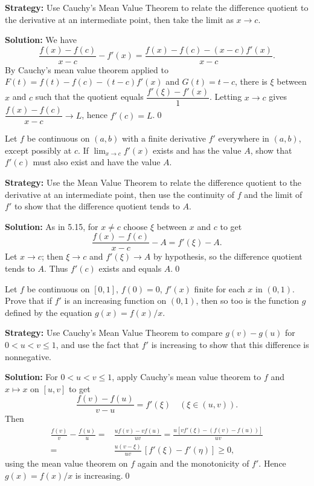 \noindent\textbf{Strategy:} Use Cauchy's Mean Value Theorem to relate the difference quotient to the derivative at an intermediate point, then take the limit as \( x \to c \).

\bigskip\noindent\textbf{Solution:}
We have
\[\frac{f(x)-f(c)}{x-c}-f'(x)=\frac{f(x)-f(c)-(x-c)f'(x)}{x-c}.\]
By Cauchy's mean value theorem applied to $F(t)=f(t)-f(c)-(t-c)f'(x)$ and $G(t)=t-c$, there is $\xi$ between $x$ and $c$ such that the quotient equals $\dfrac{f'(\xi)-f'(x)}{1}$. Letting $x\to c$ gives $\dfrac{f(x)-f(c)}{x-c}\to L$, hence $f'(c)=L$.\qed


\begin{problembox}
Let \( f \) be continuous on \( (a, b) \) with a finite derivative \( f' \) everywhere in \( (a, b) \), except possibly at \( c \). If \( \lim_{x \to c} f'(x) \) exists and has the value \( A \), show that \( f'(c) \) must also exist and have the value \( A \).
\end{problembox}

\noindent\textbf{Strategy:} Use the Mean Value Theorem to relate the difference quotient to the derivative at an intermediate point, then use the continuity of \( f \) and the limit of \( f' \) to show that the difference quotient tends to \( A \).

\bigskip\noindent\textbf{Solution:}
As in 5.15, for $x\ne c$ choose $\xi$ between $x$ and $c$ to get
\[\frac{f(x)-f(c)}{x-c}-A=f'(\xi)-A.\]
Let $x\to c$; then $\xi\to c$ and $f'(\xi)\to A$ by hypothesis, so the difference quotient tends to $A$. Thus $f'(c)$ exists and equals $A$.\qed


\begin{problembox}
Let \( f \) be continuous on \( [0, 1] \), \( f(0) = 0 \), \( f'(x) \) finite for each \( x \) in \( (0, 1) \). Prove that if \( f' \) is an increasing function on \( (0, 1) \), then so too is the function \( g \) defined by the equation \( g(x) = f(x)/x \).
\end{problembox}

\noindent\textbf{Strategy:} Use Cauchy's Mean Value Theorem to compare \( g(v) - g(u) \) for \( 0 < u < v \leq 1 \), and use the fact that \( f' \) is increasing to show that this difference is nonnegative.

\bigskip\noindent\textbf{Solution:}
For $0<u<v\le 1$, apply Cauchy's mean value theorem to $f$ and $x\mapsto x$ on $[u,v]$ to get
\[\frac{f(v)-f(u)}{v-u}=f'(\xi)\quad(\xi\in(u,v)).\]
Then
\begin{align*}
\frac{f(v)}{v}-\frac{f(u)}{u}=&\frac{uf(v)-vf(u)}{uv}=\frac{u[v f'(\xi)-(f(v)-f(u))]}{uv} \\
=& \frac{u(v-\xi)}{uv}\,[f'(\xi)-f'(\eta)]\ge 0,
\end{align*}
using the mean value theorem on $f$ again and the monotonicity of $f'$. Hence $g(x)=f(x)/x$ is increasing.\qed


